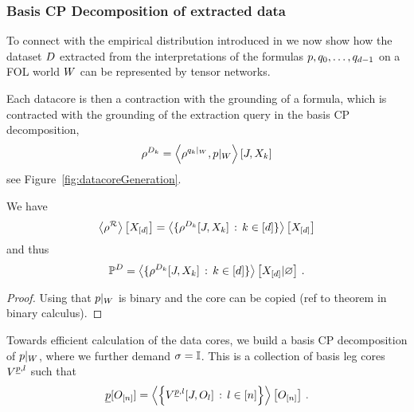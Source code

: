 \subsubsection{Basis CP Decomposition of extracted data}

To connect with the empirical distribution introduced in  we now show how the dataset $D$ extracted from the interpretations of the formulas $p,q_{0},\ldots,q_{d-1}$ on a FOL world $W$ can be represented by tensor networks.



Each datacore is then a contraction with the grounding of a formula, which is contracted with the grounding of the extraction query in the basis CP decomposition, 
\begin{align*}
	\rho^{D_{k}} = \left\langle \rho^{{q_{k}}|_{W}},{p}|_{W}\right\rangle \left[ J,X_{k} \right]
\end{align*}
see Figure~\ref{fig:datacoreGeneration}.

\begin{theorem}	
	We have
		\[ 	\left\langle \rho^{\mathcal{R}}\right\rangle \left[ X_{[d]} \right] 
		= \left\langle \{\rho^{D_{k}}[J,X_{k}] \, : \, k\in[d]\}\right\rangle \left[ X_{[d]} \right] \]
	and thus 
		\[  \mathbb{P}^{D} = \left\langle \{\rho^{D_{k}}[J,X_{k}]  \, : \, k\in[d]\}\right\rangle \left[ X_{[d]} | \varnothing \right] \, . \]
\end{theorem}
\begin{proof}
	Using that ${p}|_{W}$ is binary and the core can be copied (ref to theorem in binary calculus).
\end{proof}

Towards efficient calculation of the data cores, we build a basis CP decomposition of ${p}|_{W}$, where we further demand $\sigma=\mathbb{I}$.
This is a collection of basis leg cores $V^{\underline{p},l}$ such that
\begin{align*}
	\underline{p}[O_{[n]}] = \left\langle  \left\{ V^{\underline{p},l}[J,O_{l}] \, : \, l\in[n] \right\} \right\rangle \left[ O_{[n]} \right] \, . 
\end{align*}

